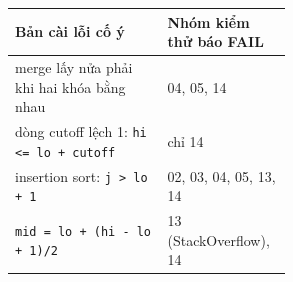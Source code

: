 \begin{tabular}{p{0.55\linewidth}l}
\toprule
Bản cài lỗi cố ý & Nhóm kiểm thử báo FAIL \\
\midrule
merge lấy nửa phải khi hai khóa bằng nhau & 04, 05, 14 \\
dòng cutoff lệch 1: \texttt{hi <= lo + cutoff} & chỉ 14 \\
insertion sort: \texttt{j > lo + 1} & 02, 03, 04, 05, 13, 14 \\
\texttt{mid = lo + (hi - lo + 1)/2} & 13 (StackOverflow), 14 \\
\bottomrule
\end{tabular}
